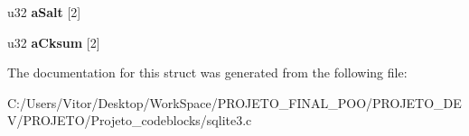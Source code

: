 \begin{DoxyCompactItemize}
\item 
\hypertarget{struct_wal_index_hdr_af99b92f673fd7ba1e4e4f9feb955453f}{u32 {\bfseries a\-Salt} \mbox{[}2\mbox{]}}\label{struct_wal_index_hdr_af99b92f673fd7ba1e4e4f9feb955453f}

\item 
\hypertarget{struct_wal_index_hdr_aa202339b02766d088717bfce9e3a9c0e}{u32 {\bfseries a\-Cksum} \mbox{[}2\mbox{]}}\label{struct_wal_index_hdr_aa202339b02766d088717bfce9e3a9c0e}

\end{DoxyCompactItemize}


The documentation for this struct was generated from the following file\-:\begin{DoxyCompactItemize}
\item 
C\-:/\-Users/\-Vitor/\-Desktop/\-Work\-Space/\-P\-R\-O\-J\-E\-T\-O\-\_\-\-F\-I\-N\-A\-L\-\_\-\-P\-O\-O/\-P\-R\-O\-J\-E\-T\-O\-\_\-\-D\-E\-V/\-P\-R\-O\-J\-E\-T\-O/\-Projeto\-\_\-codeblocks/sqlite3.\-c\end{DoxyCompactItemize}
